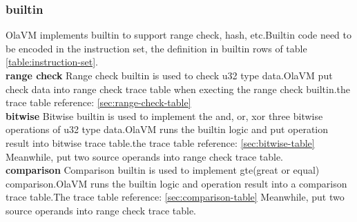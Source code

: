 \subsubsection{builtin}\label{subsec: instructions-builtin}
OlaVM implements builtin to support range check, hash, etc.Builtin code need to be encoded in the instruction set, the definition in builtin rows of table \ref{table:instruction-set}. \\
\textbf{range check}
Range check builtin is used to check u32 type data.OlaVM put check data into range check trace table when execting the range check builtin.the trace table reference: \ref{sec:range-check-table} \\
\textbf{bitwise}
Bitwise builtin is used to implement the and, or, xor three bitwise operations of u32 type data.OlaVM runs the builtin logic and put operation result into bitwise trace table.the trace table reference: \ref{sec:bitwise-table}
Meanwhile, put two source operands into range check trace table. \\
\textbf{comparison}
Comparison builtin is used to implement gte(great or equal) comparison.OlaVM runs the builtin logic and operation result into a comparison trace table.The trace table reference: \ref{sec:comparison-table}
Meanwhile, put two source operands into range check trace table.

